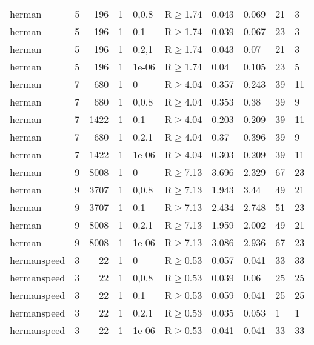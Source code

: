 \begin{longtable}{llrrllllll}
 herman        & 5        &    	196 & 1 & 0,0.8 & R$\geq$1.74  & 0.043   & 0.069   & 21      & 3    \\
 herman        & 5        &    	196 & 1 & 0.1   & R$\geq$1.74  & 0.039   & 0.067   & 23      & 3    \\
 herman        & 5        &    	196 & 1 & 0.2,1 & R$\geq$1.74  & 0.043   & 0.07    & 21      & 3    \\
 herman        & 5        &    	196 & 1 & 1e-06 & R$\geq$1.74  & 0.04    & 0.105   & 23      & 5    \\
 herman        & 7        &    	680 & 1 & 0     & R$\geq$4.04  & 0.357   & 0.243   & 39      & 11   \\
 herman        & 7        &    	680 & 1 & 0,0.8 & R$\geq$4.04  & 0.353   & 0.38    & 39      & 9    \\
 herman        & 7        &   	1422 & 1 & 0.1   & R$\geq$4.04  & 0.203   & 0.209   & 39      & 11   \\
 herman        & 7        &    	680 & 1 & 0.2,1 & R$\geq$4.04  & 0.37    & 0.396   & 39      & 9    \\
 herman        & 7        &   	1422 & 1 & 1e-06 & R$\geq$4.04  & 0.303   & 0.209   & 39      & 11   \\
 herman        & 9        &   	8008 & 1 & 0     & R$\geq$7.13  & 3.696   & 2.329   & 67      & 23   \\
 herman        & 9        &   	3707 & 1 & 0,0.8 & R$\geq$7.13  & 1.943   & 3.44    & 49      & 21   \\
 herman        & 9        &   	3707 & 1 & 0.1   & R$\geq$7.13  & 2.434   & 2.748   & 51      & 23   \\
 herman        & 9        &   	8008 & 1 & 0.2,1 & R$\geq$7.13  & 1.959   & 2.002   & 49      & 21   \\
 herman        & 9        &   	8008 & 1 & 1e-06 & R$\geq$7.13  & 3.086   & 2.936   & 67      & 23   \\
 hermanspeed   & 3        &     	22 & 1 & 0     & R$\geq$0.53  & 0.057   & 0.041   & 33      & 33   \\
 hermanspeed   & 3        &     	22 & 1 & 0,0.8 & R$\geq$0.53  & 0.039   & 0.06    & 25      & 25   \\
 hermanspeed   & 3        &     	22 & 1 & 0.1   & R$\geq$0.53  & 0.059   & 0.041   & 25      & 25   \\
 hermanspeed   & 3        &     	22 & 1 & 0.2,1 & R$\geq$0.53  & 0.035   & 0.053   & 1       & 1    \\
 hermanspeed   & 3        &     	22 & 1 & 1e-06 & R$\geq$0.53  & 0.041   & 0.041   & 33      & 33   \\

\end{longtable}
